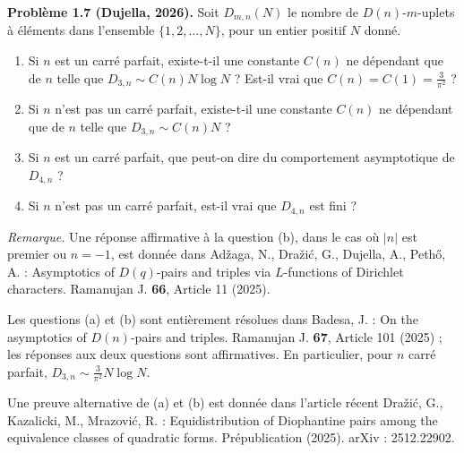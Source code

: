 \textbf{Problème 1.7 (Dujella, 2026).} Soit $D_{m,n}(N)$ le nombre de $D(n)$-$m$-uplets à éléments dans l'ensemble $\{1,2,\ldots,N\}$, pour un entier positif $N$ donné.
\begin{enumerate}
\item[(a)] Si $n$ est un carré parfait, existe-t-il une constante $C(n)$ ne dépendant que de $n$ telle que $D_{3,n} \sim C(n)N \log N$ ? Est-il vrai que $C(n) = C(1) = \frac{3}{\pi^2}$ ?
\item[(b)] Si $n$ n'est pas un carré parfait, existe-t-il une constante $C(n)$ ne dépendant que de $n$ telle que $D_{3,n} \sim C(n)N$ ?
\item[(c)] Si $n$ est un carré parfait, que peut-on dire du comportement asymptotique de $D_{4,n}$ ?
\item[(d)] Si $n$ n'est pas un carré parfait, est-il vrai que $D_{4,n}$ est fini ?
\end{enumerate}

\medskip

\textit{Remarque.} Une réponse affirmative à la question (b), dans le cas où $|n|$ est premier ou $n=-1$, est donnée dans Adžaga, N., Dražić, G., Dujella, A., Pethő, A. : Asymptotics of $D(q)$-pairs and triples via $L$-functions of Dirichlet characters. Ramanujan J. \textbf{66}, Article 11 (2025).

Les questions (a) et (b) sont entièrement résolues dans Badesa, J. : On the asymptotics of $D(n)$-pairs and triples. Ramanujan J. \textbf{67}, Article 101 (2025) ; les réponses aux deux questions sont affirmatives. En particulier, pour $n$ carré parfait, $D_{3,n} \sim \frac{3}{\pi^2}N \log N$.

Une preuve alternative de (a) et (b) est donnée dans l'article récent Dražić, G., Kazalicki, M., Mrazović, R. : Equidistribution of Diophantine pairs among the equivalence classes of quadratic forms. Prépublication (2025). arXiv : 2512.22902.
